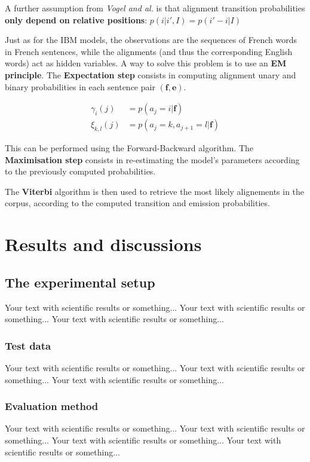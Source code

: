 \documentclass[final]{beamer}
\begin{document}
\begin{frame}[t]
\begin{multicols}{3}
A further assumption from \textit{Vogel and al.} is that alignment transition probabilities \textbf{only depend on relative positions}: $p(i|i',I) = p(i'-i|I)$

Just as for the IBM models, the observations are the sequences of French words in French sentences, while the alignments (and thus the corresponding English words) act as hidden variables. A way to solve this problem is to use an \textbf{EM principle}.
The \textbf{Expectation step} consists in computing alignment unary and binary probabilities in each sentence pair $(\textbf{f},\textbf{e})$. 

\begin{align*}
\gamma_i(j) &= p(a_j=i|\textbf{f})\\
\xi_{k,l}(j) &= p(a_j=k,a_{j+1}=l|\textbf{f})
\end{align*}

This can be performed using the Forward-Backward algorithm.
The \textbf{Maximisation step} consists in re-estimating the model's parameters according to the previously computed probabilities.

The \textbf{Viterbi} algorithm is then used to retrieve the most likely alignements in the corpus, according to the computed transition and emission probabilities.

\section{Results and discussions}

\subsection{The experimental setup}

Your text with scientific results or something... 
Your text with scientific results or something... 
Your text with scientific results or something...

\subsubsection{Test data}
 
Your text with scientific results or something... 
Your text with scientific results or something... 
Your text with scientific results or something... 

\subsubsection{Evaluation method}
Your text with scientific results or something... 
Your text with scientific results or something... 
Your text with scientific results or something... 
Your text with scientific results or something... 




\end{multicols}
\end{frame}
\end{document}
